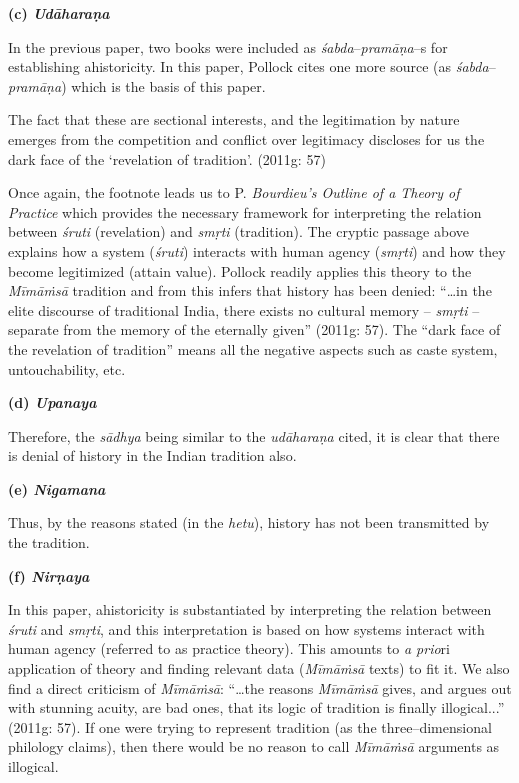 \textbf{(c) \textit{Udāharaṇa}}

In the previous paper, two books were included as\textit{ śabda}–\textit{pramāṇa}–s for establishing ahistoricity. In this paper, Pollock cites one more source (as \textit{śabda}–\textit{pramāṇa}) which is the basis of this paper.

\begin{myquote}
The fact that these are sectional interests, and the legitimation by nature emerges from the competition and conflict over legitimacy discloses for us the dark face of the ‘revelation of tradition’. (2011g: 57)
\end{myquote}

Once again, the footnote leads us to P. \textit{Bourdieu’s Outline of a Theory of Practice} which provides the necessary framework for interpreting the relation between \textit{śruti }(revelation) and \textit{smṛti} (tradition). The cryptic passage above explains how a system (\textit{śruti}) interacts with human agency (\textit{smṛti}) and how they become legitimized (attain value). Pollock readily applies this theory to the \textit{Mīmāṁsā} tradition and from this infers that history has been denied: “…in the elite discourse of traditional India, there exists no cultural memory –\textit{ smṛti }– separate from the memory of the eternally given” (2011g: 57). The “dark face of the revelation of tradition” means all the negative aspects such as caste system, untouchability, etc.

\textbf{(d) \textit{Upanaya}}

Therefore, the \textit{sādhya} being similar to the \textit{udāharaṇa} cited, it is clear that there is denial of history in the Indian tradition also.

\textbf{(e) \textit{Nigamana}}

Thus, by the reasons stated (in the \textit{hetu}), history has not been transmitted by the tradition.

\textbf{(f) \textit{Nirṇaya}}

In this paper, ahistoricity is substantiated by interpreting the relation between \textit{śruti} and \textit{smṛti}, and this interpretation is based on how systems interact with human agency (referred to as practice theory). This amounts to \textit{a prio}ri application of theory and finding relevant data (\textit{Mīmāṁsā} texts) to fit it. We also find a direct criticism of \textit{Mīmāṁsā}: “…the reasons \textit{Mīmāṁsā} gives, and argues out with stunning acuity, are bad ones, that its logic of tradition is finally illogical...” (2011g: 57). If one were trying to represent tradition (as the three–dimensional philology claims), then there would be no reason to call \textit{Mīmāṁsā} arguments as illogical.

